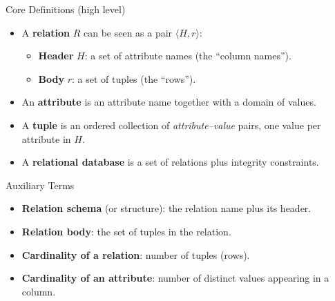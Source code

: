 \documentclass[10pt,aspectratio=169]{beamer}
\begin{document}
\begin{frame}{Core Definitions (high level)}
\small
\begin{itemize}
  \item A \textbf{relation} $R$ can be seen as a pair $\langle H, r\rangle$:
  \begin{itemize}
    \item \textbf{Header} $H$: a set of attribute names (the ``column names'').
    \item \textbf{Body} $r$: a set of tuples (the ``rows'').
  \end{itemize}
  \item An \textbf{attribute} is an attribute name together with a domain of values.
  \item A \textbf{tuple} is an ordered collection of \emph{attribute--value} pairs, one value per attribute in $H$.
  \item A \textbf{relational database} is a set of relations plus integrity constraints.
\end{itemize}
\end{frame}

\begin{frame}{Auxiliary Terms}
\begin{itemize}
  \item \textbf{Relation schema} (or structure): the relation name plus its header.
  \item \textbf{Relation body}: the set of tuples in the relation.
  \item \textbf{Cardinality of a relation}: number of tuples (rows).
  \item \textbf{Cardinality of an attribute}: number of distinct values appearing in a column.
\end{itemize}
\end{frame}
\end{document}
